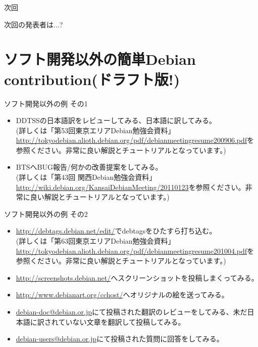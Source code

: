 \begin{frame}{次回}

\begin{center}
\Large
次回の発表者は...?
\end{center}

\end{frame}

\section{ソフト開発以外の簡単Debian contribution(ドラフト版!)}

\begin{frame}{ソフト開発以外の例 その1}

\begin{itemize}
\item DDTSSの日本語訳をレビューしてみる、日本語に訳してみる。\\
(詳しくは「第53回東京エリアDebian勉強会資料」\url{http://tokyodebian.alioth.debian.org/pdf/debianmeetingresume200906.pdf}を参照ください。非常に良い解説とチュートリアルとなっています。)
\item BTSへBUG報告/何かの改善提案をしてみる。\\
(詳しくは「第43回 関西Debian勉強会資料」\url{http://wiki.debian.org/KansaiDebianMeeting/20110123}を参照ください。非常に良い解説とチュートリアルとなっています。)
\end{itemize}

\end{frame}

\begin{frame}{ソフト開発以外の例 その2}
\begin{itemize}
\item \url{http://debtags.debian.net/edit/}でdebtagsをひたすら打ち込む。\\
(詳しくは「第63回東京エリアDebian勉強会資料」\url{http://tokyodebian.alioth.debian.org/pdf/debianmeetingresume201004.pdf}を参照ください。非常に良い解説とチュートリアルとなっています。)
\item \url{http://screenshots.debian.net/}へスクリーンショットを投稿しまくってみる。
\item \url{http://www.debianart.org/cchost/}へオリジナルの絵を送ってみる。
\item \url{debian-doc@debian.or.jp}にて投稿された翻訳のレビューをしてみる、未だ日本語に訳されていない文章を翻訳して投稿してみる。
\item \url{debian-users@debian.or.jp}にて投稿された質問に回答をしてみる。
\end{itemize}
\end{frame}

